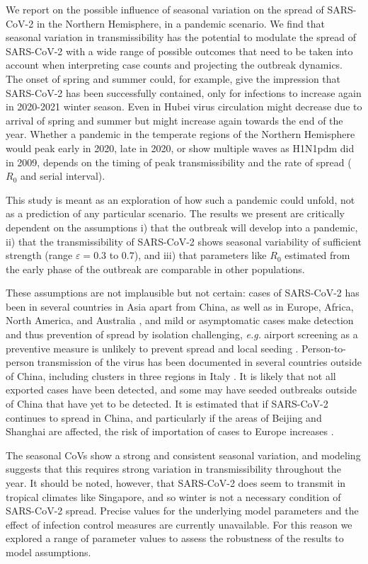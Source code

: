 \documentclass[rmp, reprint, superscriptaddress, floatfix,amsmath]{revtex4-1}
\newcommand{\forcing}{\varepsilon}
\begin{document}
We report on the possible influence of seasonal variation on the spread of SARS-CoV-2 in the Northern Hemisphere, in a pandemic scenario. We find that seasonal variation in transmissibility has the potential to modulate the spread of SARS-CoV-2 with a wide range of possible outcomes that need to be taken into account when interpreting case counts and projecting the outbreak dynamics. 
The onset of spring and summer could, for example, give the impression that SARS-CoV-2 has been successfully contained, only for infections to increase again in 2020-2021 winter season. 
Even in Hubei virus circulation might decrease due to arrival of spring and summer but might increase again towards the end of the year.
Whether a pandemic in the temperate regions of the Northern Hemisphere would peak early in 2020, late in 2020, or show multiple waves as H1N1pdm did in 2009, depends on the timing of peak transmissibility and the rate of spread ($R_0$ and serial interval).

This study is meant as an exploration of how such a pandemic could unfold, not as a prediction of any particular scenario.
The results we present are critically dependent on the assumptions
i) that the outbreak will develop into a pandemic,
ii) that the transmissibility of SARS-CoV-2 shows seasonal variability of sufficient strength (range $\forcing=0.3$ to $0.7$), and  
iii) that parameters like $R_0$ estimated from the early phase of the outbreak are comparable in other populations. 

These assumptions are not implausible but not certain: cases of SARS-CoV-2 has been in several countries in Asia apart from China, as well as in Europe, Africa, North America, and Australia \citep{WHO_situation_report37}, and mild or asymptomatic cases make detection and thus prevention of spread by isolation challenging, \textit{e.g.} airport screening as a preventive measure is unlikely to prevent spread and local seeding \citep{quilty2020effectiveness}. 
Person-to-person transmission of the virus has been documented in several countries outside of China, including clusters in three regions in Italy \citep{ECDC_23feb}. 
It is likely that not all exported cases have been detected, and some may have seeded outbreaks outside of China that have yet to be detected. It is estimated that if SARS-CoV-2 continues to spread in China, and particularly if the areas of Beijing and Shanghai are affected, the risk of importation of cases to Europe increases \citep{pullano2020novel}.

The seasonal CoVs show a strong and consistent seasonal variation, and modeling suggests that this requires strong variation in transmissibility throughout the year.
It should be noted, however, that SARS-CoV-2 does seem to transmit in tropical climates like Singapore, and so winter is not a necessary condition of SARS-CoV-2 spread. 
Precise values for the underlying model parameters and the effect of infection control measures are currently unavailable. For this reason we explored a range of parameter values to assess the robustness of the results to model assumptions.
\end{document}
